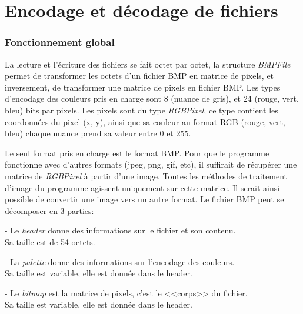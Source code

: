 \documentclass{article}
\begin{document}
	\newpage


	
	\part*{Encodage et décodage de fichiers}
		
		\section{Fonctionnement global}
			La lecture et l'écriture des fichiers se fait octet par octet, la structure \emph{BMPFile} permet de transformer les octets d'un fichier BMP en matrice de pixels, et inversement, de transformer une matrice de pixels en fichier BMP. Les types d'encodage des couleurs pris en charge sont 8 (nuance de gris), et 24 (rouge, vert, bleu) bits par pixels. Les pixels sont du type \emph{RGBPixel}, ce type contient les coordonnées du pixel (x, y), ainsi que sa couleur au format RGB (rouge, vert, bleu) chaque nuance prend sa valeur entre 0 et 255.
			\\\par Le seul format pris en charge est le format BMP. Pour que le programme fonctionne avec d'autres formats (jpeg, png, gif, etc), il suffirait de récupérer une matrice de \emph{RGBPixel} à partir d'une image. Toutes les méthodes de traitement d'image du programme agissent uniquement sur cette matrice. Il serait ainsi possible de convertir une image vers un autre format. Le fichier BMP peut se décomposer en 3 parties:
			\begin{description}
				\item - Le \emph{header} donne des informations sur le fichier et son contenu. \hfill\\
					Sa taille est de 54 octets.
				\item - La \emph{palette} donne des informations sur l'encodage des couleurs. \hfill\\
					Sa taille est variable, elle est donnée dans le header.
				\item - Le \emph{bitmap} est la matrice de pixels, c'est le <<corps>> du fichier. \hfill\\
					Sa taille est variable, elle est donnée dans le header.
			\end{description}
		
\end{document}
